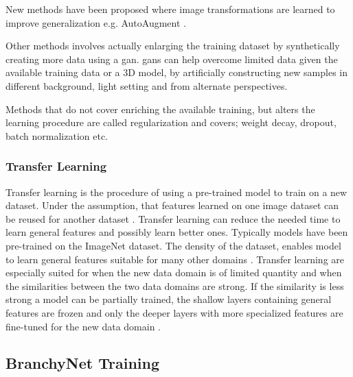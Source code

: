 New methods have been proposed where image transformations are learned to improve generalization e.g. AutoAugment \cite{cubuk_autoaugment:_2018}. 

Other methods involves actually enlarging the training dataset by synthetically creating more data using a \gls{gan}. \gls{gan}s can help overcome limited data given the available training data or a 3D model, by artificially constructing new samples in different background, light setting and from alternate perspectives.

Methods that do not cover enriching the available training, but alters the learning procedure are called regularization and covers; weight decay, dropout, batch normalization etc.

\subsubsection{Transfer Learning}

Transfer learning is the procedure of using a pre-trained model to train on a new dataset. Under the assumption, that features learned on one image dataset can be reused for another dataset \cite{yosinski_how_2014}. Transfer learning can reduce the needed time to learn general features and possibly learn better ones. Typically models have been pre-trained on the ImageNet dataset. The density of the dataset, enables model to learn general features suitable for many other domains \cite{kornblith_better_2019}. Transfer learning are especially suited for when the new data domain is of limited quantity and when the similarities between the two data domains are strong. If the similarity is less strong a model can be partially trained, the shallow layers containing general features are frozen and only the deeper layers with more specialized features are fine-tuned for the new data domain \cite{li_cs231n:_2018}.


\subsection{BranchyNet Training}

